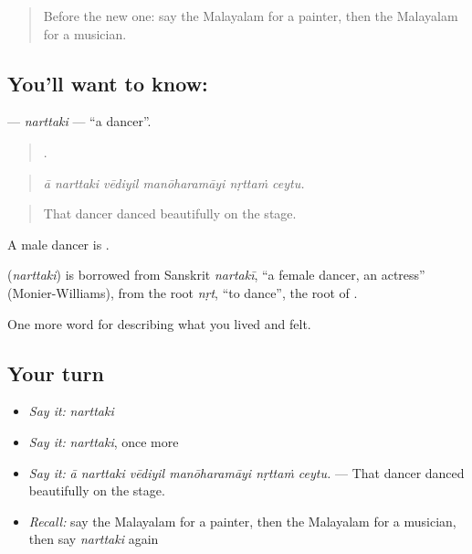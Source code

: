 \label{lesson:ML-C565-narttaki}



\begin{quote}
Before the new one: say the Malayalam for a painter, then the Malayalam for a musician.
\end{quote}

\subsection*{You'll want to know: }
\textbf{} — \emph{narttaki} — \textquotedblleft{}a dancer\textquotedblright{}.

\begin{quote}
     .
\end{quote}

\begin{quote}
\emph{ā narttaki vēdiyil manōharamāyi nṛttaṁ ceytu.}
\end{quote}

\begin{quote}
That dancer danced beautifully on the stage.
\end{quote}

A male dancer is .

\begin{cousinweb}
\textbf{} (\emph{narttaki}) is borrowed from Sanskrit \emph{nartakī}, \textquotedblleft{}a female dancer, an actress\textquotedblright{} (Monier-Williams), from the root \emph{nṛt}, \textquotedblleft{}to dance\textquotedblright{}, the root of .
\end{cousinweb}

\begin{grammarlens}[title={What you've built}]
One more word for describing what you lived and felt.
\end{grammarlens}

\subsection*{Your turn}
\begin{itemize}
\raggedright
  \item \emph{Say it:} \emph{narttaki}
  \item \emph{Say it:} \emph{narttaki}, once more
  \item \emph{Say it:} \emph{ā narttaki vēdiyil manōharamāyi nṛttaṁ ceytu.} — That dancer danced beautifully on the stage.
  \item \emph{Recall:} say the Malayalam for a painter, then the Malayalam for a musician, then say \emph{narttaki} again
\end{itemize}

